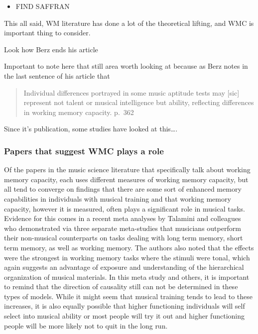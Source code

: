 \documentclass[]{book}
\providecommand{\tightlist}{%
  \setlength{\itemsep}{0pt}\setlength{\parskip}{0pt}}
\theoremstyle{definition}
\theoremstyle{definition}
\theoremstyle{definition}
\theoremstyle{remark}
\begin{document}
\begin{itemize}
\tightlist
\item
  FIND SAFFRAN \citep{saffranStatisticalLearningTone1999}
\end{itemize}

This all said, WM literature has done a lot of the theoretical lifting,
and WMC is important thing to consider.

Look how Berz ends his article

Important to note here that still area worth looking at because as Berz
notes in the last sentence of his article that

\begin{quote}
Individual differences portrayed in some music aptitude tests may
{[}sic{]} represent not talent or musical intelligence but ability,
reflecting differences in working memory capacity. p.~362
\end{quote}

Since it's publication, some studies have looked at this\ldots{}.

\hypertarget{papers-that-suggest-wmc-plays-a-role}{%
\subsubsection{Papers that suggest WMC plays a
role}\label{papers-that-suggest-wmc-plays-a-role}}

Of the papers in the music science literature that specifically talk
about working memory capacity, each uses different measures of working
memory capacity, but all tend to converge on findings that there are
some sort of enhanced memory capabilities in individuals with musical
training and that working memory capacity, however it is measured, often
plays a significant role in musical tasks. Evidence for this comes in a
recent meta analyses by Talamini and colleagues
\citep{talaminiMusiciansHaveBetter2017} who demonstrated via three
separate meta-studies that musicians outperform their non-musical
counterparts on tasks dealing with long term memory, short term memory,
as well as working memory. The authors also noted that the effects were
the strongest in working memory tasks where the stimuli were tonal,
which again suggests an advantage of exposure and understanding of the
hierarchical organization of musical materials. In this meta study and
others, it is important to remind that the direction of causality still
can not be determined in these types of models. While it might seem that
musical training tends to lead to these increases, it is also equally
possible that higher functioning individuals will self select into
musical ability or most people will try it out and higher functioning
people will be more likely not to quit in the long run.
\end{document}
